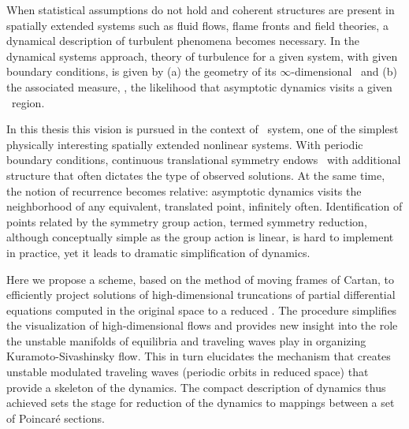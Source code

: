 
When statistical assumptions do not hold and coherent
structures are present in spatially extended systems
such as fluid flows, flame fronts and field theories,
a dynamical description of turbulent phenomena becomes
necessary.
In the dynamical systems approach, theory of turbulence for a
given system, with given boundary conditions, is given by (a)
the geometry of its $\infty$-dimensional \statesp\ and (b) the associated measure,
\ie, the likelihood that asymptotic dynamics visits a given
\statesp\ region.

In this thesis this vision is pursued in the context of \KS\
system, one of the simplest physically interesting spatially
extended nonlinear systems.
With periodic boundary conditions, continuous
translational symmetry endows \statesp\ with additional
structure that often dictates the type of observed solutions.
At the same time, the notion of recurrence becomes relative:
asymptotic dynamics visits the neighborhood of any
equivalent, translated point, infinitely often.
Identification of points related by the symmetry group
action, termed symmetry reduction, although conceptually
simple as the group action is linear, is hard to implement in
practice, yet it leads to dramatic simplification of
dynamics.

Here we propose a scheme, based on the method of moving
frames of Cartan, to efficiently project solutions of
high-dimensional truncations of partial differential
equations computed in the original space to a reduced
\statesp. The procedure simplifies the visualization of
high-dimensional flows and provides new insight into the role
the unstable manifolds of equilibria and traveling waves play
in organizing Kuramoto-Sivashinsky flow. This in turn
elucidates the mechanism that creates unstable modulated
traveling waves (periodic orbits in reduced space) that
provide a skeleton of the dynamics. The compact
description of dynamics thus achieved sets the stage for
reduction of the dynamics to mappings between a set of
Poincar\'e sections.
